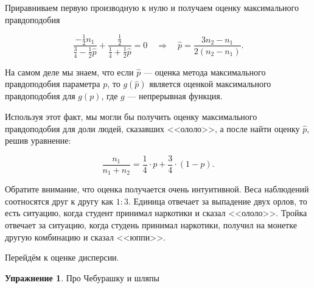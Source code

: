 \documentclass[12pt, a4paper, oneside]{extreport}
\theoremstyle{plain}              %
\theoremstyle{definition}         %
\newtheorem{problem}{\color{myblue} Упражнение}
\begin{document}
\begin{sol}
	Приравниваем первую производную к нулю и получаем оценку максимального правдоподобия
	
	\begin{equation*} 
\frac{ - \frac{1}{2} n_1}{\frac{3}{4} - \frac{1}{2} \hat p} + \frac{\frac{1}{2}}{\frac{1}{4} + \frac{1}{2} \hat p} = 0 \quad \Rightarrow \quad \hat p = \frac{3 n_2 - n_1}{2(n_2 - n_1)}.
	\end{equation*}
	
На самом деле мы знаем, что если $\hat p$ --- оценка метода максимального правдоподобия параметра $p$, то $g(\hat p)$ является оценкой максимального правдоподобия для $g(p)$,  где   $g$ --- непрерывная функция. 

Используя этот факт, мы могли бы получить оценку максимального правдоподобия для доли людей, сказавших <<ололо>>, а после найти оценку $\hat p$, решив уравнение: 

\[ 
\frac{n_1}{n_1 + n_2} = \frac{1}{4} \cdot p + \frac{3}{4} \cdot (1-p).
\]

Обратите внимание, что оценка получается очень интуитивной. Веса наблюдений соотносятся друг к другу как $1 : 3$.  Единица отвечает за выпадение двух орлов, то есть ситуацию, когда студент принимал наркотики и сказал <<ололо>>. Тройка отвечает за ситуацию, когда студень принимал наркотики, получил на монетке другую комбинацию и сказал <<юппи>>. 

Перейдём к оценке дисперсии. 	
	
\end{sol} 





\begin{problem} 
	Про Чебурашку и шляпы 


	\begin{sol}

	\end{sol}
\end{problem}
\end{document}
